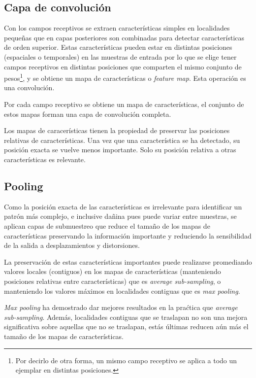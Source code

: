 \documentclass[spanish,11pt,letterpaper]{article}
\begin{document}
\subsection{Capa de convolución}

Con los campos receptivos se extraen características simples en localidades
pequeñas que en capas posteriores
son combinadas para detectar características de orden superior. Estas características
pueden estar en distintas posiciones (espaciales o temporales) en las muestras
de entrada por lo que se elige tener campos receptivos en distintas posiciones
que comparten el mismo conjunto de pesos\footnote{Por decirlo de otra forma, un
mismo campo receptivo se aplica a todo un ejemplar en distintas posiciones.}, y
se obtiene un mapa de características o \textit{feature map}. Esta operación es
una convolución.

Por cada campo receptivo se obtiene un mapa de características, el conjunto de
estos mapas forman una capa de convolución completa.

Los mapas de caracerísticas tienen la propiedad de preservar las posiciones
relativas de características. Una vez que una característica se ha detectado,
su posición exacta se vuelve menos importante. Solo su posición relativa a otras
características es relevante.

\subsection{Pooling}

Como la posición exacta de las características es irrelevante para identificar
un patrón más complejo, e inclusive dañina pues puede variar entre muestras, se
aplican capas de submuestreo que reduce el tamaño de los mapas de características
preservando la información importante y reduciendo la sensibilidad de la salida
a desplazamientos y distorsiones.

La preservación de estas características importantes puede realizarse promediando
valores locales (contiguos) en los mapas de características (manteniendo posiciones
relativas entre características) que es \textit{average sub-sampling}, o manteniendo
los valores máximos en localidades contiguas que es \textit{max pooling}.

\textit{Max pooling} ha demostrado dar mejores resultados en la praćtica que
\textit{average sub-sampling}\cite{pooling}. Además, localidades contiguas que se traslapan
no son una mejora significativa sobre aquellas que no se traslapan, estás
últimas reducen aún más el tamaño de los mapas de características.
\end{document}

